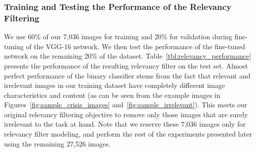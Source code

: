 \documentclass{iscram}
\begin{document}
\subsubsection{Training and Testing the Performance of the Relevancy Filtering}%
We use 60\% of our 7,036 images for training and 20\% for validation during fine-tuning of the VGG-16 network. We then test the performance of the fine-tuned network on the remaining 20\% of the dataset. Table~\ref{tbl:relevancy_performance} presents the performance of the resulting relevancy filter on the test set. Almost perfect performance of the binary classifier stems from the fact that relevant and irrelevant images in our training dataset have completely different image characteristics and content (as can be seen from the example images in Figures~\ref{fig:sample_crisis_images} and~\ref{fig:sample_irrelevant}).
This meets our original relevancy filtering objective to remove only those images that are surely irrelevant to the task at hand. Note that we reserve these 7,036 images only for relevancy filter modeling, and perform the rest of the experiments presented later using the remaining 27,526 images.
\end{document}
